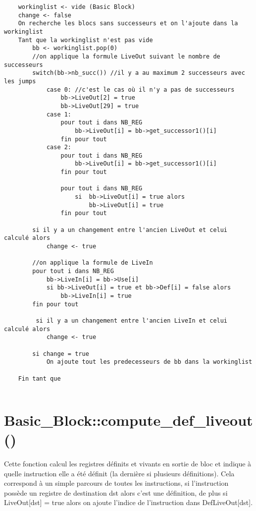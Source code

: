 \documentclass[a4paper,12pt]{report}
\begin{document}
\begin{verbatim}
    workinglist <- vide (Basic Block)
    change <- false
    On recherche les blocs sans successeurs et on l'ajoute dans la workinglist
    Tant que la workinglist n'est pas vide
        bb <- workinglist.pop(0)
        //on applique la formule LiveOut suivant le nombre de successeurs
        switch(bb->nb_succ()) //il y a au maximum 2 successeurs avec les jumps
            case 0: //c'est le cas où il n'y a pas de successeurs
                bb->LiveOut[2] = true
                bb->LiveOut[29] = true
            case 1:
                pour tout i dans NB_REG
                    bb->LiveOut[i] = bb->get_successor1()[i]
                fin pour tout
            case 2:
                pour tout i dans NB_REG
                    bb->LiveOut[i] = bb->get_successor1()[i]
                fin pour tout
                
                pour tout i dans NB_REG
                    si  bb->LiveOut[i] = true alors
                        bb->LiveOut[i] = true
                fin pour tout
        
        si il y a un changement entre l'ancien LiveOut et celui calculé alors
            change <- true
        
        //on applique la formule de LiveIn
        pour tout i dans NB_REG
            bb->LiveIn[i] = bb->Use[i]
            si bb->LiveOut[i] = true et bb->Def[i] = false alors
                bb->LiveIn[i] = true
        fin pour tout
        
         si il y a un changement entre l'ancien LiveIn et celui calculé alors
            change <- true
            
        si change = true
            On ajoute tout les predecesseurs de bb dans la workinglist
    
    Fin tant que
        
\end{verbatim}
\section{Basic\_Block::compute\_def\_liveout()}
\paragraph*{}
Cette fonction calcul les registres définits et vivants en sortie de bloc et indique à quelle instruction elle a été définit (la dernière si plusieurs définitions).
Cela correspond à un simple parcours de toutes les instructions, si l'instruction possède un registre de destination dst alors c'est une définition, de plus si LiveOut[dst] = true alors on ajoute l'indice de l'instruction dans DefLiveOut[dst].
\end{document}
